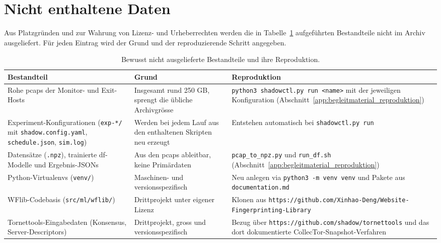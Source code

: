 \section{Nicht enthaltene Daten}
\label{app:begleitmaterial_ausschluesse}

Aus Platzgründen und zur Wahrung von Lizenz- und Urheberrechten werden die in Tabelle~\ref{tab:begleitmaterial_ausschluesse} aufgeführten Bestandteile nicht im Archiv ausgeliefert.
Für jeden Eintrag wird der Grund und der reproduzierende Schritt angegeben.

\begin{table}[H]
\centering
\caption{Bewusst nicht ausgelieferte Bestandteile und ihre Reproduktion.}
\label{tab:begleitmaterial_ausschluesse}
\begin{tabular}{p{3.7cm}p{4.2cm}p{5.4cm}}
\hline
Bestandteil & Grund & Reproduktion \\
\hline
Rohe \glspl{pcap} der Monitor- und Exit-Hosts & Insgesamt rund 250 GB, sprengt die übliche Archivgrösse & \texttt{python3 shadowctl.py run <name>} mit der jeweiligen Konfiguration (Abschnitt~\ref{app:begleitmaterial_reproduktion}) \\
Experiment-Konfigurationen (\texttt{exp-*/} mit \texttt{shadow.config.yaml}, \texttt{schedule.json}, \texttt{sim.log}) & Werden bei jedem Lauf aus den enthaltenen Skripten neu erzeugt & Entstehen automatisch bei \texttt{shadowctl.py run} \\
Datensätze (\texttt{.npz}), trainierte \gls{df}-Modelle und Ergebnis-JSONs & Aus den \glspl{pcap} ableitbar, keine Primärdaten & \texttt{pcap\_to\_npz.py} und \texttt{run\_df.sh} (Abschnitt~\ref{app:begleitmaterial_reproduktion}) \\
Python-Virtualenvs (\texttt{venv/}) & Maschinen- und versionsspezifisch & Neu anlegen via \texttt{python3 -m venv venv} und Pakete aus \texttt{documentation.md} \\
WFlib-Codebasis (\texttt{src/ml/wflib/}) & Drittprojekt unter eigener Lizenz~\cite{deng2023robust} & Klonen aus \texttt{https://github.com/Xinhao-Deng/Website-Fingerprinting-Library} \\
Tornettools-Eingabedaten (Konsensus, Server-Descriptors) & Drittprojekt, gross und versionsspezifisch & Bezug über \texttt{https://github.com/shadow/tornettools} und das dort dokumentierte CollecTor-Snapshot-Verfahren \\
\hline
\end{tabular}
\end{table}

